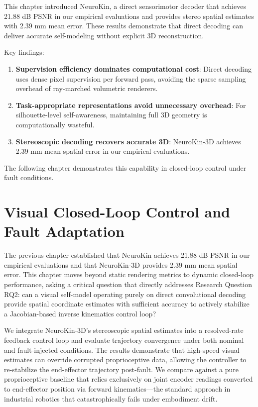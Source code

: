 \documentclass[12pt,a4paper,oneside]{report}
\begin{document}
This chapter introduced NeuroKin, a direct sensorimotor decoder that achieves 21.88 dB PSNR in our empirical evaluations and provides stereo spatial estimates with 2.39 mm mean error. These results demonstrate that direct decoding can deliver accurate self-modeling without explicit 3D reconstruction.

Key findings:

\begin{enumerate}
    \item \textbf{Supervision efficiency dominates computational cost}: Direct decoding uses dense pixel supervision per forward pass, avoiding the sparse sampling overhead of ray-marched volumetric renderers.
    \item \textbf{Task-appropriate representations avoid unnecessary overhead}: For silhouette-level self-awareness, maintaining full 3D geometry is computationally wasteful.
    \item \textbf{Stereoscopic decoding recovers accurate 3D}: NeuroKin-3D achieves 2.39 mm mean spatial error in our empirical evaluations.
\end{enumerate}

The following chapter demonstrates this capability in closed-loop control under fault conditions.

\chapter{Visual Closed-Loop Control and Fault Adaptation}
\label{chap:closed_loop_fault_adaptation}

The previous chapter established that NeuroKin achieves 21.88 dB PSNR in our empirical evaluations and that NeuroKin-3D provides 2.39 mm mean spatial error. This chapter moves beyond static rendering metrics to dynamic closed-loop performance, asking a critical question that directly addresses Research Question RQ2: can a visual self-model operating purely on direct convolutional decoding provide spatial coordinate estimates with sufficient accuracy to actively stabilize a Jacobian-based inverse kinematics control loop?

We integrate NeuroKin-3D's stereoscopic spatial estimates into a resolved-rate feedback control loop and evaluate trajectory convergence under both nominal and fault-injected conditions. The results demonstrate that high-speed visual estimates can override corrupted proprioceptive data, allowing the controller to re-stabilize the end-effector trajectory post-fault. We compare against a pure proprioceptive baseline that relies exclusively on joint encoder readings converted to end-effector position via forward kinematics—the standard approach in industrial robotics that catastrophically fails under embodiment drift.
\end{document}
